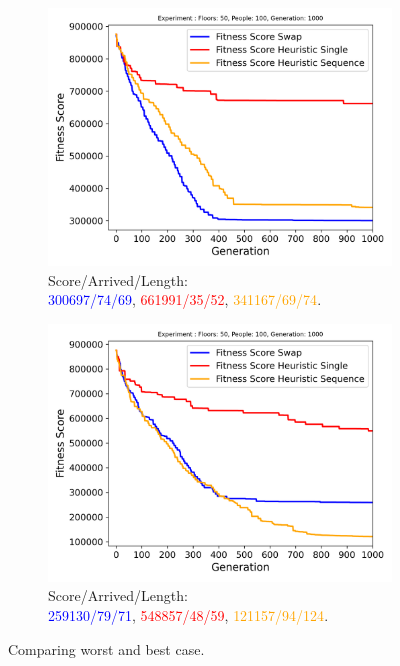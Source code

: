 \begin{figure}[ht]
	\centering
	\begin{subfigure}[b]{0.49\linewidth}
		\centering
		\includegraphics[width=\linewidth]{results/Building_Medium/Mutation_0.1/Floors__50,_People__100,_Generation__1000_4_worst.png}
		\captionsetup{justification=centering,font=tiny}
		\caption{Score/Arrived/Length:\\\textcolor{blue}{300697/74/69}, \textcolor{red}{661991/35/52}, \textcolor{orange}{341167/69/74}.}
		\label{fig:Building Medium worst}
	\end{subfigure}
	\hfill
	\begin{subfigure}[b]{0.49\linewidth}
		\centering
		\includegraphics[width=\linewidth]{results/Building_Medium/Mutation_0.1/Floors__50,_People__100,_Generation__1000_1_best.png}
		\captionsetup{justification=centering,font=tiny}
		\caption{Score/Arrived/Length:\\\textcolor{blue}{259130/79/71}, \textcolor{red}{548857/48/59}, \textcolor{orange}{121157/94/124}.}
		\label{fig:Building Medium best}
	\end{subfigure}
	\captionsetup{font=scriptsize}
	\caption{Comparing worst and best case.}
	\label{fig:Building Medium results}
\end{figure}


